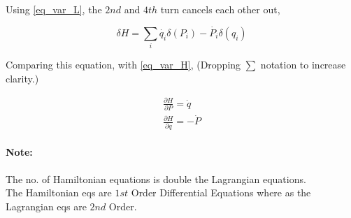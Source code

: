 \documentclass[a4paper]{article}
\newcommand{\pdt}[2]{\frac{\partial #1}{\partial #2}}
\begin{document}
		Using \eqref{eq_var_L}, the $2nd$ and $4th$ turn cancels each other out, 

		$$ \delta H = \sum_i \dot{q_i} \delta(P_i) - \dot{P_i} \delta(q_i) $$

		Comparing this equation, with \eqref{eq_var_H}, ({Dropping $\sum$ notation to increase clarity.})

		\begin{eqnarray}
			\pdt{H}{P} = \dot{q} \\
			\pdt{H}{q} = -\dot{P}
		\end{eqnarray}

		\paragraph*{Note:}
			The no. of Hamiltonian equations is double the Lagrangian equations. \\
			The Hamiltonian eqs are $1st$ Order Differential Equations where as the Lagrangian eqs are $2nd$ Order.
\end{document}
